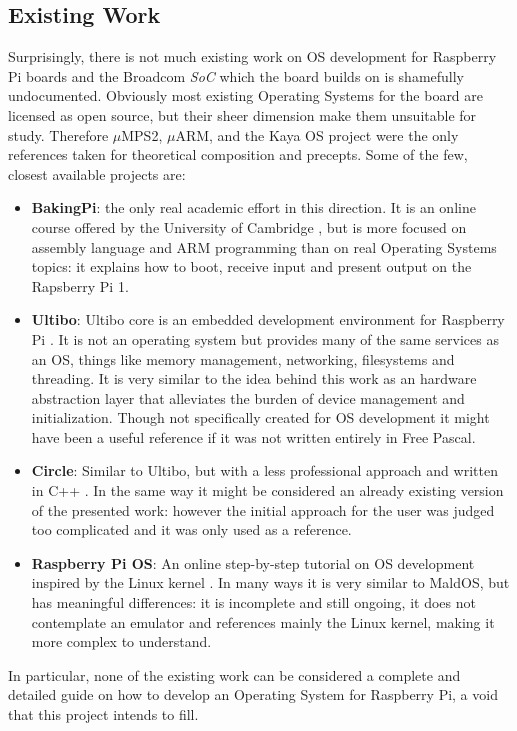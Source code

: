 \documentclass[12pt,a4paper,openright,twoside]{report}
\begin{document}
\subsection{Existing Work}
Surprisingly, there is not much existing work on OS development for Raspberry Pi 
boards and the Broadcom \textit{SoC} which the board builds on is shamefully undocumented. 
Obviously most existing
Operating Systems for the board are licensed as open source, but their sheer
dimension make them unsuitable for study.
Therefore $\mu$MPS2, $\mu$ARM, and the Kaya OS project were the only references
taken for theoretical composition and precepts.
Some of the few, closest available projects are:
\begin{itemize}
    \item \textbf{BakingPi}: the only real academic effort in this direction. It is an
        online course offered by the University of Cambridge \cite{bakingpi}, 
        but is more focused on assembly language and ARM programming than on real
        Operating Systems topics: it explains how to boot, receive input and present
        output on the Rapsberry Pi 1.
    \item \textbf{Ultibo}: Ultibo core is an embedded development environment 
        for Raspberry Pi \cite{ultibo}. It is not an operating system but provides many of 
        the same services as an OS, things like memory management, networking, 
        filesystems and threading. It is very similar to the idea behind this work
        as an hardware abstraction layer that alleviates the burden of device
        management and initialization. Though not specifically created for 
        OS development it might have been a useful reference if it was not
        written entirely in Free Pascal.
    \item \textbf{Circle}: Similar to Ultibo, but with a less professional approach
        and written in C++ \cite{circle}. In the same way it might be considered an already
        existing version of the presented work: however the initial approach 
        for the user was judged too complicated and it was only used as a reference.
    \item \textbf{Raspberry Pi OS}: An online step-by-step tutorial on OS development
        inspired by the Linux kernel \cite{raspberrypios}. In many ways it is very
        similar to MaldOS, but has meaningful differences: it is incomplete and
        still ongoing, it does not contemplate an emulator and references mainly
        the Linux kernel, making it more complex to understand.
\end{itemize}
In particular, none of the existing work can be considered a complete and detailed
guide on how to develop an Operating System for Raspberry Pi, a void that this
project intends to fill.
\end{document}
